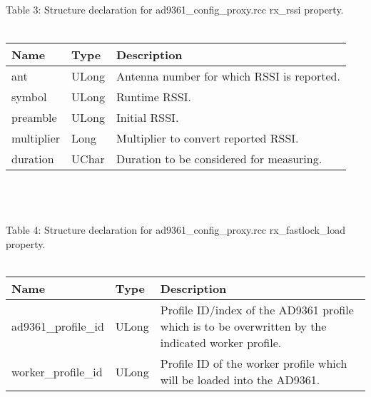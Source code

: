 \documentclass{article}
\def\comp{ad9361\_config\_proxy}
\begin{document}
\begin{landscape}
\\ \\ \\ \\ \\ \\ \\ \\ \\
	Table \hypertarget{tab3}{3}: Structure declaration for \comp{}.rcc rx\_rssi property.\\ \\
		\begin{scriptsize}
		\begin{tabular}{|p{4.7cm}|p{2.7cm}|p{13.77cm}|} \hline  \cellcolor{blue} Name & \cellcolor{blue}Type & \cellcolor{blue}Description \\ \hline ant & ULong & Antenna number for which RSSI is reported. \\ \hline symbol & ULong & Runtime RSSI. \\ \hline preamble & ULong & Initial RSSI. \\ \hline multiplier & Long & Multiplier to convert reported RSSI. \\ \hline duration & UChar & Duration to be considered for measuring. \\ \hline\end{tabular}
	\end{scriptsize}\\ \\ \\
	Table \hypertarget{tab4}{4}: Structure declaration for \comp{}.rcc rx\_fastlock\_load property.\\ \\
		\begin{scriptsize}
		\begin{tabular}{|p{4.7cm}|p{2.7cm}|p{13.77cm}|} \hline \cellcolor{blue} Name & \cellcolor{blue}Type & \cellcolor{blue}Description \\ \hline ad9361\_profile\_id & ULong & Profile ID/index of the AD9361 profile which is to be overwritten by the indicated worker profile. \\ \hline worker\_profile\_id & ULong & Profile ID of the worker profile which will be loaded into the AD9361. \\ \hline \end{tabular}

\end{scriptsize}
\end{landscape}
\end{document}

